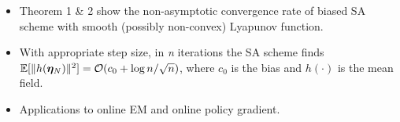 \documentclass[a0,landscape]{a0poster}
\theoremstyle{definition}
\begin{document}
\begin{multicols}{3}
\begin{tcolorbox}[colback=white!5!white,colframe=blue!75!black,fonttitle=\sffamily\bfseries\large,title=Conclusion]
\begin{itemize}
\item {\color{blue} Theorem 1 \& 2} show the non-asymptotic convergence rate of biased SA scheme with smooth (possibly non-convex) Lyapunov function. 
\item With appropriate step size, in \emph{n} iterations the SA scheme finds 
$\mathbb{E}[ \| h( \bm{\eta}_N ) \|^2 ] = {\cal O}( c_0 + \log n / \sqrt{n} )$, where $c_0$ is the bias and $h(\cdot)$ is the mean field.
\item Applications to online EM and online policy gradient.
\end{itemize}
\end{tcolorbox}
\vspace{-1.3cm}
\small







\end{multicols}
\begin{center}
\end{center}
\end{document}
